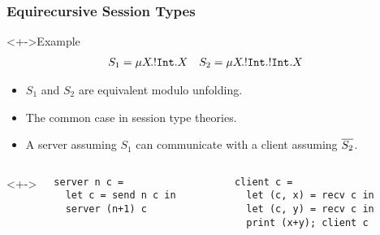 \documentclass[aspectratio=169]{beamer}
\begin{document}
\begin{frame}
  \frametitle{Equirecursive Session Types}
  \begin{exampleblock}<+->{Example}
    \vspace{-1.5\baselineskip}
    \begin{align*}
      S_1 &= \mu X\!.{{}!\mathtt{Int}.X} &
      S_2 &= \mu X\!.{{}!\mathtt{Int}.{}!\mathtt{Int}.X}
    \end{align*}
    \begin{itemize}
    \item $S_1$ and $S_2$ are equivalent  modulo unfolding.
    \item The common case in session type theories.
    \item A server assuming $S_1$ can communicate with a client
      assuming $\overline{S_2}$.
    \end{itemize}
  \end{exampleblock}
  \begin{columns}<+->
    \begin{column}{0.48\linewidth}
\begin{verbatim}
server n c =
  let c = send n c in
  server (n+1) c

\end{verbatim}
    \end{column}
    \begin{column}{0.48\linewidth}
\begin{verbatim}
client c =
  let (c, x) = recv c in
  let (c, y) = recv c in
  print (x+y); client c
\end{verbatim}
    \end{column}
  \end{columns}
\end{frame}
\end{document}
